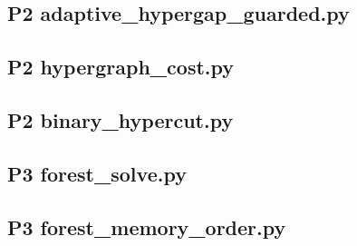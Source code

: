\documentclass[anonymous,notoc]{gmcm2026}
\begin{document}
\subsection{P2 adaptive\_hypergap\_guarded.py}

\subsection{P2 hypergraph\_cost.py}

\subsection{P2 binary\_hypercut.py}

\subsection{P3 forest\_solve.py}

\subsection{P3 forest\_memory\_order.py}

\end{document}

